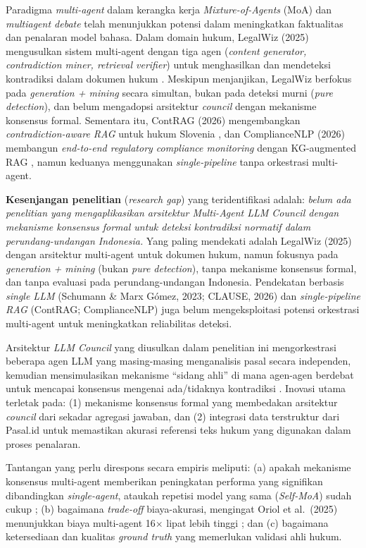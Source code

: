 Paradigma \textit{multi-agent} dalam kerangka kerja \textit{Mixture-of-Agents} (MoA) \cite{wang2024moa} dan \textit{multiagent debate} \cite{du2023} telah menunjukkan potensi dalam meningkatkan faktualitas dan penalaran model bahasa. Dalam domain hukum, LegalWiz (2025) mengusulkan sistem multi-agent dengan tiga agen (\textit{content generator, contradiction miner, retrieval verifier}) untuk menghasilkan dan mendeteksi kontradiksi dalam dokumen hukum \cite{legalwiz2025}. Meskipun menjanjikan, LegalWiz berfokus pada \textit{generation + mining} secara simultan, bukan pada deteksi murni (\textit{pure detection}), dan belum mengadopsi arsitektur \textit{council} dengan mekanisme konsensus formal. Sementara itu, ContRAG (2026) mengembangkan \textit{contradiction-aware RAG} untuk hukum Slovenia \cite{contrag2026}, dan ComplianceNLP (2026) membangun \textit{end-to-end regulatory compliance monitoring} dengan KG-augmented RAG \cite{compliancenlp2026}, namun keduanya menggunakan \textit{single-pipeline} tanpa orkestrasi multi-agent.

\textbf{Kesenjangan penelitian} (\textit{research gap}) yang teridentifikasi adalah: \textit{belum ada penelitian yang mengaplikasikan arsitektur Multi-Agent LLM Council dengan mekanisme konsensus formal untuk deteksi kontradiksi normatif dalam perundang-undangan Indonesia.} Yang paling mendekati adalah LegalWiz (2025) dengan arsitektur multi-agent untuk dokumen hukum, namun fokusnya pada \textit{generation + mining} (bukan \textit{pure detection}), tanpa mekanisme konsensus formal, dan tanpa evaluasi pada perundang-undangan Indonesia. Pendekatan berbasis \textit{single LLM} (Schumann \& Marx Gómez, 2023; CLAUSE, 2026) dan \textit{single-pipeline RAG} (ContRAG; ComplianceNLP) juga belum mengeksploitasi potensi orkestrasi multi-agent untuk meningkatkan reliabilitas deteksi.

Arsitektur \textit{LLM Council} yang diusulkan dalam penelitian ini mengorkestrasi beberapa agen LLM yang masing-masing menganalisis pasal secara independen, kemudian mensimulasikan mekanisme ``sidang ahli'' di mana agen-agen berdebat untuk mencapai konsensus mengenai ada/tidaknya kontradiksi \cite{du2023, wang2024moa}. Inovasi utama terletak pada: (1) mekanisme konsensus formal yang membedakan arsitektur \textit{council} dari sekadar agregasi jawaban, dan (2) integrasi data terstruktur dari Pasal.id untuk memastikan akurasi referensi teks hukum yang digunakan dalam proses penalaran.

Tantangan yang perlu direspons secara empiris meliputi: (a) apakah mekanisme konsensus multi-agent memberikan peningkatan performa yang signifikan dibandingkan \textit{single-agent}, ataukah repetisi model yang sama (\textit{Self-MoA}) sudah cukup \cite{lismoa2025}; (b) bagaimana \textit{trade-off} biaya-akurasi, mengingat Oriol et al.\ (2025) menunjukkan biaya multi-agent 16$\times$ lipat lebih tinggi \cite{oriol2025}; dan (c) bagaimana ketersediaan dan kualitas \textit{ground truth} yang memerlukan validasi ahli hukum.

